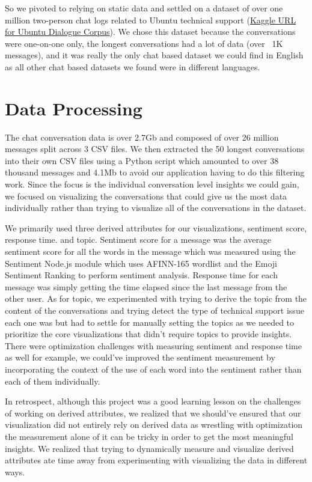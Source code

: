 \documentclass{article}\usepackage{graphicx}
\begin{document}
So we pivoted to relying on static data and settled on a dataset of over one million two-person chat logs related to Ubuntu technical support (\href{https://www.kaggle.com/datasets/rtatman/ubuntu-dialogue-corpus/data}{Kaggle URL for Ubuntu Dialogue Corpus}). We chose this dataset because the conversations were one-on-one only, the longest conversations had a lot of data (over ~1K messages), and it was really the only chat based dataset we could find in English as all other chat based datasets we found were in different languages. 

\section{Data Processing}
The chat conversation data is over 2.7Gb and composed of over 26 million messages split across 3 CSV files. We then extracted the 50 longest conversations into their own CSV files using a Python script which amounted to over 38 thousand messages and 4.1Mb to avoid our application having to do this filtering work. Since the focus is the individual conversation level insights we could gain, we focused on visualizing the conversations that could give us the most data individually rather than trying to visualize all of the conversations in the dataset. 
\newline

We primarily used three derived attributes for our visualizations, sentiment score, response time. and topic. Sentiment score for a message was the average sentiment score for all the words in the message which was measured using the Sentiment Node.js module which uses AFINN-165 wordlist and the Emoji Sentiment Ranking to perform sentiment analysis. Response time for each message was simply getting the time elapsed since the last message from the other user. As for topic, we experimented with trying to derive the topic from the content of the conversations and trying detect the type of technical support issue each one was but had to settle for manually setting the topics as we needed to prioritize the core visualizations that didn't require topics to provide insights. There were optimization challenges with measuring sentiment and response time as well for example, we could've improved the sentiment measurement by incorporating the context of the use of each word into the sentiment rather than each of them individually.
\newline

 In retrospect, although this project was a good learning lesson on the challenges of working on derived attributes, we realized that we should've ensured that our visualization did not entirely rely on derived data as wrestling with optimization the measurement alone of it can be tricky in order to get the most meaningful insights. We realized that trying to dynamically measure and visualize derived attributes ate time away from experimenting with visualizing the data in different ways.
\end{document}

